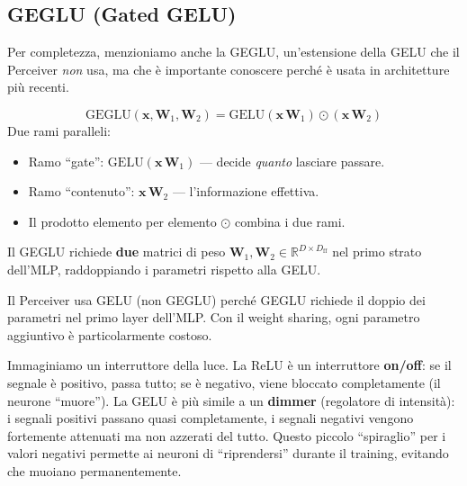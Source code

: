 \documentclass[12pt,a4paper]{article}
\begin{document}
\subsection{GEGLU (Gated GELU)} \label{sec:geglu}

Per completezza, menzioniamo anche la GEGLU, un'estensione della GELU che il Perceiver \emph{non} usa, ma che \`e importante conoscere perch\'e \`e usata in architetture pi\`u recenti.

\begin{formulabox}
\[
\text{GEGLU}(\mathbf{x}, \mathbf{W}_1, \mathbf{W}_2) = \text{GELU}(\mathbf{x}\, \mathbf{W}_1) \odot (\mathbf{x}\, \mathbf{W}_2)
\]
Due rami paralleli:
\begin{itemize}
    \item Ramo ``gate'': $\text{GELU}(\mathbf{x}\, \mathbf{W}_1)$ --- decide \emph{quanto} lasciare passare.
    \item Ramo ``contenuto'': $\mathbf{x}\, \mathbf{W}_2$ --- l'informazione effettiva.
    \item Il prodotto elemento per elemento $\odot$ combina i due rami.
\end{itemize}
Il GEGLU richiede \textbf{due} matrici di peso $\mathbf{W}_1, \mathbf{W}_2 \in \mathbb{R}^{D \times D_{\text{ff}}}$ nel primo strato dell'MLP, raddoppiando i parametri rispetto alla GELU.
\end{formulabox}

Il Perceiver usa GELU (non GEGLU) perch\'e GEGLU richiede il doppio dei parametri nel primo layer dell'MLP. Con il weight sharing, ogni parametro aggiuntivo \`e particolarmente costoso.

\begin{notabox}
Immaginiamo un interruttore della luce. La ReLU \`e un interruttore \textbf{on/off}: se il segnale \`e positivo, passa tutto; se \`e negativo, viene bloccato completamente (il neurone ``muore''). La GELU \`e pi\`u simile a un \textbf{dimmer} (regolatore di intensit\`a): i segnali positivi passano quasi completamente, i segnali negativi vengono fortemente attenuati ma non azzerati del tutto. Questo piccolo ``spiraglio'' per i valori negativi permette ai neuroni di ``riprendersi'' durante il training, evitando che muoiano permanentemente.
\end{notabox}
\end{document}
